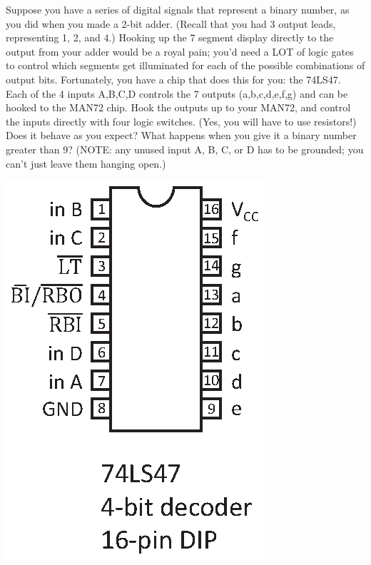 \begin{enumerate}


\begin{minipage}{.70\textwidth}

\item Suppose you have a series of digital signals that represent a binary number, as you did when you made a 2-bit adder.  (Recall that you had 3 output leads, representing 1, 2, and 4.) Hooking up the 7 segment display directly to the output from your adder would be a royal pain; you'd need a LOT of logic gates to control which segments get illuminated for each of the possible combinations of output bits.  Fortunately, you have a chip that does this for you: the 74LS47.  Each of the 4 inputs A,B,C,D controls the 7 outputs (a,b,c,d,e,f,g) and can be hooked to the MAN72 chip.  Hook the outputs up to your MAN72, and control the inputs directly with four logic switches.  (Yes, you will have to use resistors!)  Does it behave as you expect?  What happens when you give it a binary number greater than 9?  (NOTE: any unused input A, B, C, or D has to be grounded; you can't just leave them hanging open.)  
\end{minipage}
\begin{minipage}{.28\textwidth}
\includegraphics[scale=0.8]{appendices/pinouts/74LS47.eps}
\end{minipage}



\end{enumerate}
